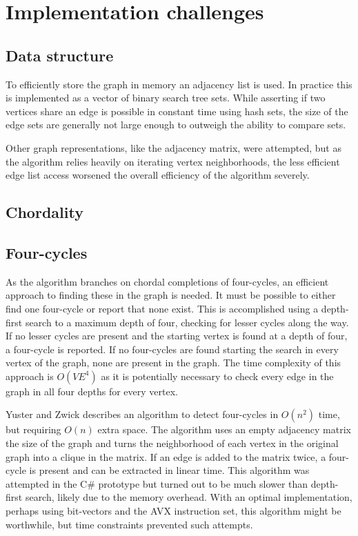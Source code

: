 \documentclass{article}
\begin{document}
	\section{Implementation challenges}

		\subsection{Data structure}
		To efficiently store the graph in memory an adjacency list is used.
		In practice this is implemented as a vector of binary search tree sets.
		While asserting if two vertices share an edge is possible in constant time using hash sets, the size of the edge sets are generally not large enough to outweigh the ability to compare sets.

		Other graph representations, like the adjacency matrix, were attempted, but as the algorithm relies heavily on iterating vertex neighborhoods, the less efficient edge list access worsened the overall efficiency of the algorithm severely.

		\subsection{Chordality}

		\subsection{Four-cycles}
		As the algorithm branches on chordal completions of four-cycles, an efficient approach to finding these in the graph is needed.
		It must be possible to either find one four-cycle or report that none exist.
		This is accomplished using a depth-first search to a maximum depth of four, checking for lesser cycles along the way.
		If no lesser cycles are present and the starting vertex is found at a depth of four, a four-cycle is reported.
		If no four-cycles are found starting the search in every vertex of the graph, none are present in the graph.
		The time complexity of this approach is $O(VE^4)$ as it is potentially necessary to check every edge in the graph in all four depths for every vertex.

		Yuster and Zwick\cite{finding-even-cycles} describes an algorithm to detect four-cycles in $O(n^2)$ time, but requiring $O(n)$ extra space.
		The algorithm uses an empty adjacency matrix the size of the graph and turns the neighborhood of each vertex in the original graph into a clique in the matrix.
		If an edge is added to the matrix twice, a four-cycle is present and can be extracted in linear time.
		This algorithm was attempted in the C\# prototype but turned out to be much slower than depth-first search, likely due to the memory overhead.
		With an optimal implementation, perhaps using bit-vectors and the AVX instruction set, this algorithm might be worthwhile, but time constraints prevented such attempts.
\end{document}
